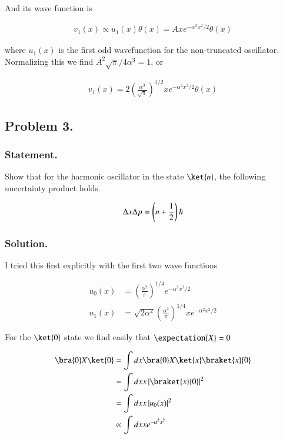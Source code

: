 And its wave function is 

\begin{align}\label{eqn:desaiCh9:201}
v_1(x) \propto u_1(x) \theta(x) = A x e^{-\alpha^2 x^2/2} \theta(x)
\end{align}

where $u_1(x)$ is the first odd wavefunction for the non-truncated oscillator.  Normalizing this we find $A^2 \sqrt{\pi}/4 \alpha^3 = 1$, or

\begin{align}\label{eqn:desaiCh9:202}
v_1(x) = 2 \left( \frac{\alpha^3}{\sqrt{\pi}}\right)^{1/2} x e^{-\alpha^2 x^2/2} \theta(x)
\end{align}

\subsection{Problem 3.}
\subsubsection{Statement.}
Show that for the harmonic oscillator in the state $\ket{n}$, the following uncertainty product holds.

\begin{align}\label{eqn:desaiCh9:300}
\Delta x \Delta p = \left( n + \frac{1}{2} \right) \hbar
\end{align}

\subsubsection{Solution.}

I tried this first explicitly with the first two wave functions

\begin{align}\label{eqn:desaiCh9:301}
u_0(x) &= \left(\frac{\alpha^2}{\pi}\right)^{1/4} e^{- \alpha^2 x^2/2} \\
u_1(x) &= \sqrt{2 \alpha^2} \left(\frac{\alpha^2}{\pi}\right)^{1/4} x e^{- \alpha^2 x^2/2}
\end{align}

For the $\ket{0}$ state we find easily that $\expectation{X} = 0$

\begin{align*}
\bra{0} X \ket{0} 
&=
\int dx \bra{0} X \ket{x} \braket{x}{0} \\
&=
\int dx x \Abs{\braket{x}{0}}^2 \\
&=
\int dx x \Abs{u_0(x)}^2 \\
&\propto
\int dx x e^{-\alpha^2 x^2} 
\end{align*}

